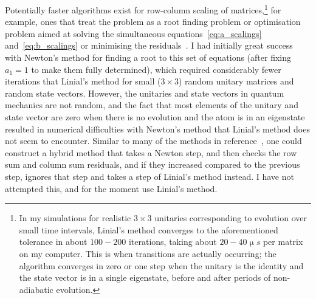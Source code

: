 Potentially faster algorithms exist for row-column scaling of matrices,\footnote{In my simulations for realistic $3\times3$ unitaries corresponding to evolution over small time intervals, Linial's method converges to the aforementioned tolerance in about $100-200$ iterations, taking about $20-40\unit{\upmu s}$ per matrix on my computer. This is when transitions are actually occurring; the algorithm converges in zero or one step when the unitary is the identity and the state vector is in a single eigenstate, before and after periods of non-adiabatic evolution.} for example, ones that treat the problem as a root finding problem or optimisation problem aimed at solving the simultaneous equations~\eqref{eq:a_scalings} and~\eqref{eq:b_scalings} or minimising the residuals~\cite{knight_fast_2013}. I had initially great success with Newton's method for finding a root to this set of equations (after fixing $a_1=1$ to make them fully determined), which required considerably fewer iterations that Linial's method for small ($3\times3$) random unitary matrices and random state vectors. However, the unitaries and state vectors in quantum mechanics are not random, and the fact that most elements of the unitary and state vector are zero when there is no evolution and the atom is in an eigenstate resulted in numerical difficulties with Newton's method that Linial's method does not seem to encounter. Similar to many of the methods in reference~\cite{knight_fast_2013}, one could construct a hybrid method that takes a Newton step, and then checks the row sum and column sum residuals, and if they increased compared to the previous step, ignores that step and takes a step of Linial's method instead. I have not attempted this, and for the moment use Linial's method.


